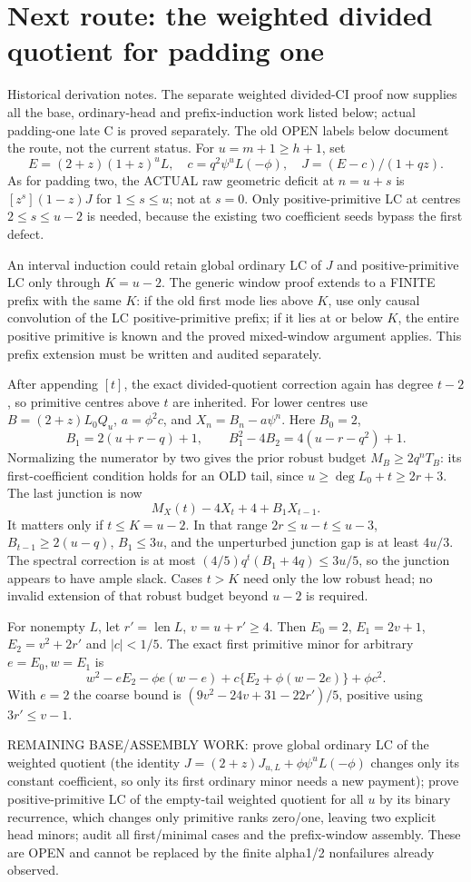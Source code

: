 \section{Next route: the weighted divided quotient for padding one}
Historical derivation notes. The separate weighted divided-CI proof
now supplies all the base, ordinary-head and prefix-induction work
listed below; actual padding-one late C is proved separately. The
old OPEN labels below document the route, not the current status.
For $u=m+1\ge h+1$, set
\[
 E=(2+z)(1+z)^uL,\quad c=q^2\psi^uL(-\phi),\quad
 J=(E-c)/(1+qz).
\]
As for padding two, the ACTUAL raw geometric deficit at $n=u+s$
is $[z^s](1-z)J$ for $1\le s\le u$; not at $s=0$.
Only positive-primitive LC at centres $2\le s\le u-2$ is needed,
because the existing two coefficient seeds bypass the first defect.

An interval induction could retain global ordinary LC of $J$ and
positive-primitive LC only through $K=u-2$. The generic window
proof extends to a FINITE prefix with the same $K$: if the old
first mode lies above $K$, use only causal convolution of the LC
positive-primitive prefix; if it lies at or below $K$, the entire
positive primitive is known and the proved mixed-window argument
applies. This prefix extension must be written and audited separately.

After appending $[t]$, the exact divided-quotient correction again
has degree $t-2$, so primitive centres above $t$ are inherited.
For lower centres use $B=(2+z)L_0Q_u$, $a=\phi^2c$, and
$X_n=B_n-a\psi^n$. Here $B_0=2$,
\[
 B_1=2(u+r-q)+1,\qquad B_1^2-4B_2=4(u-r-q^2)+1.
\]
Normalizing the numerator by two gives the prior robust budget
$M_B\ge2q^nT_B$: its first-coefficient condition holds for an OLD
tail, since $u\ge\deg L_0+t\ge2r+3$.
The last junction is now
\[
 M_X(t)-4X_t+4+B_1X_{t-1}.
\]
It matters only if $t\le K=u-2$. In that range
$2r\le u-t\le u-3$, $B_{t-1}\ge2(u-q)$,
$B_1\le3u$, and the unperturbed junction gap is at least $4u/3$.
The spectral correction is at most
$(4/5)q^t(B_1+4q)\le3u/5$, so the junction appears to have
ample slack. Cases $t>K$ need only the low robust head; no invalid
extension of that robust budget beyond $u-2$ is required.

For nonempty $L$, let $r'=\operatorname{len}L$, $v=u+r'\ge4$.
Then $E_0=2$, $E_1=2v+1$, $E_2=v^2+2r'$ and $|c|<1/5$.
The exact first primitive minor for arbitrary $e=E_0,w=E_1$ is
\[
 w^2-eE_2-\phi e(w-e)
       +c\{E_2+\phi(w-2e)\}+\phi c^2.
\]
With $e=2$ the coarse bound is
$(9v^2-24v+31-22r')/5$, positive using $3r'\le v-1$.

REMAINING BASE/ASSEMBLY WORK: prove global ordinary LC of the
weighted quotient (the identity $J=(2+z)J_{u,L}+\phi\psi^uL(-\phi)$
changes only its constant coefficient, so only its first ordinary
minor needs a new payment); prove positive-primitive LC of the
empty-tail weighted quotient for all $u$ by its binary recurrence,
which changes only primitive ranks zero/one, leaving two explicit
head minors; audit all first/minimal cases and the prefix-window
assembly. These are OPEN and cannot be replaced by the finite
alpha1/2 nonfailures already observed.
